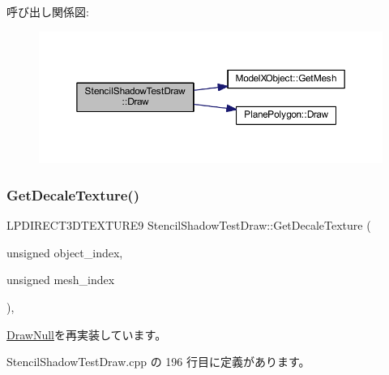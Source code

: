 呼び出し関係図\+:\nopagebreak
\begin{figure}[H]
\begin{center}
\leavevmode
\includegraphics[width=350pt]{class_stencil_shadow_test_draw_abb5f9445b7d94c213a3751fa57e36643_cgraph}
\end{center}
\end{figure}
\mbox{\label{class_stencil_shadow_test_draw_a387a97781f743aa0ea0727c050ef53b2}} 
\subsubsection{\texorpdfstring{Get\+Decale\+Texture()}{GetDecaleTexture()}}
{\footnotesize\ttfamily L\+P\+D\+I\+R\+E\+C\+T3\+D\+T\+E\+X\+T\+U\+R\+E9 Stencil\+Shadow\+Test\+Draw\+::\+Get\+Decale\+Texture (\begin{DoxyParamCaption}\item[{unsigned}]{object\+\_\+index,  }\item[{unsigned}]{mesh\+\_\+index }\end{DoxyParamCaption})\hspace{0.3cm}{\ttfamily [override]}, {\ttfamily [virtual]}}



\mbox{\hyperlink{class_draw_null_a8496ed1b1f765a331a8f1704122b8ca4}{Draw\+Null}}を再実装しています。



 Stencil\+Shadow\+Test\+Draw.\+cpp の 196 行目に定義があります。

